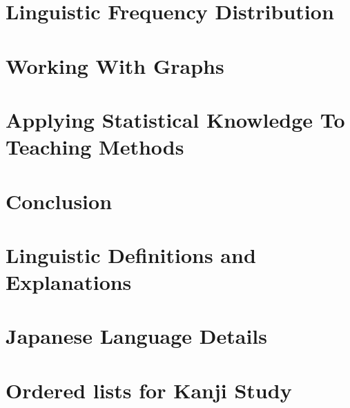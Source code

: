 \documentclass[tg, eng]{ita}    %
\begin{document}
\chapter{Linguistic Frequency Distribution}\label{chap:frequency}


% 

\chapter{Working With Graphs}\label{chap:graphs}


\chapter{Applying Statistical Knowledge To Teaching Methods}\label{chap:teaching}


\chapter{Conclusion}\label{chap:conclusion}


\renewcommand\bibname{\itareferencesnamebabel} %


\appendix
\chapter{Linguistic Definitions and Explanations}

\chapter{Japanese Language Details}

\chapter{Ordered lists for Kanji Study}





\end{document}
